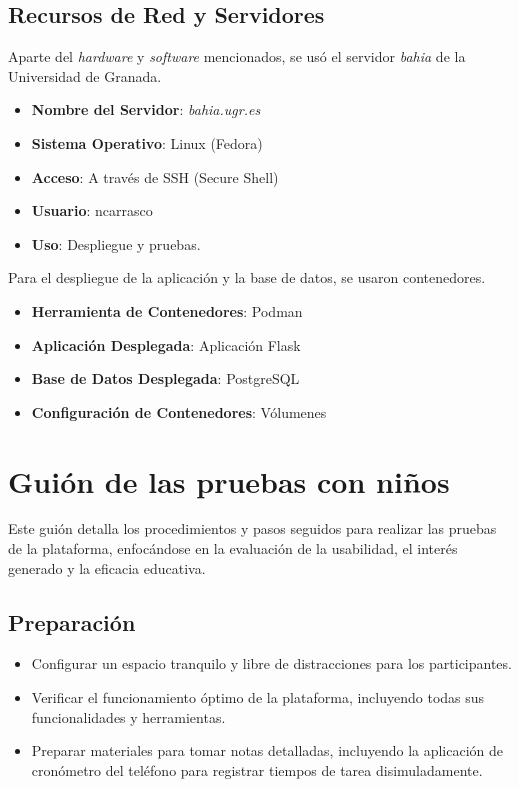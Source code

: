 \begin{appendices}
\section{Recursos de Red y Servidores}

Aparte del \textit{hardware} y \textit{software} mencionados, se usó el servidor \textit{bahia} de la Universidad de Granada.

\begin{itemize}
    \item \textbf{Nombre del Servidor}: \textit{bahia.ugr.es}
    \item \textbf{Sistema Operativo}: Linux (Fedora)
    \item \textbf{Acceso}: A través de SSH (Secure Shell)
    \item \textbf{Usuario}: ncarrasco
    \item \textbf{Uso}: Despliegue y pruebas.
\end{itemize}

Para el despliegue de la aplicación y la base de datos, se usaron contenedores. 

\begin{itemize}
    \item \textbf{Herramienta de Contenedores}: Podman
    \item \textbf{Aplicación Desplegada}: Aplicación Flask
    \item \textbf{Base de Datos Desplegada}: PostgreSQL
    \item \textbf{Configuración de Contenedores}: Vólumenes
\end{itemize}


\chapter{Guión de las pruebas con niños} \label{chap:guion}

Este guión detalla los procedimientos y pasos seguidos para realizar las pruebas de la plataforma, enfocándose en la evaluación de la usabilidad, el interés generado y la eficacia educativa.

\section{Preparación}
\begin{itemize}
    \item Configurar un espacio tranquilo y libre de distracciones para los participantes.
    \item Verificar el funcionamiento óptimo de la plataforma, incluyendo todas sus funcionalidades y herramientas.
    \item Preparar materiales para tomar notas detalladas, incluyendo la aplicación de cronómetro del teléfono para registrar tiempos de tarea disimuladamente.
\end{itemize}


\end{appendices}
